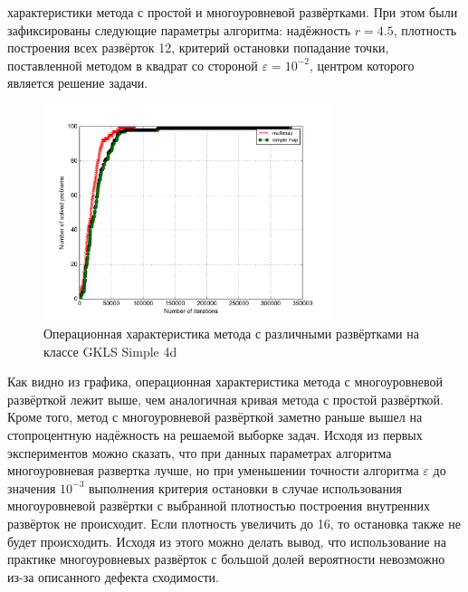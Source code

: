 характеристики метода с простой и многоуровневой развёртками. При этом были зафиксированы следующие параметры алгоритма: надёжность \(r=4.5\), плотность построения всех развёрток 12, критерий остановки попадание
точки, поставленной методом в квадрат со стороной \(\varepsilon=10^{-2}\), центром которого является решение задачи.
\begin{figure}[h]
	\center
  \includegraphics[width=0.75\textwidth]{multimap_op.png}
  \caption{Операционная характеристика метода с различными развёртками на классе GKLS Simple 4d}
  \label{fig:multimapOP}
\end{figure}
Как видно из графика, операционная характеристика метода с многоуровневой развёрткой лежит выше, чем аналогичная кривая метода с простой развёрткой. Кроме того, метод с многоуровневой развёрткой
заметно раньше вышел на стопроцентную надёжность на решаемой выборке задач. Исходя из первых экспериментов можно сказать, что при данных параметрах алгоритма многоуровневая развертка лучше, но
при уменьшении точности алгоритма \(\varepsilon\) до значения \(10^{-3}\) выполнения критерия остановки в случае использования многоуровневой развёртки с выбранной плотностью построения внутренних развёрток не происходит.
Если плотность увеличить до 16, то остановка также не будет происходить. Исходя из этого можно делать вывод, что использование на практике многоуровневых развёрток с большой долей вероятности
невозможно из-за описанного дефекта сходимости.
